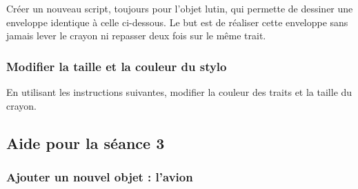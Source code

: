 Créer un nouveau script, toujours pour l'objet lutin, qui permette de dessiner une enveloppe identique à celle ci-dessous. Le but est de réaliser cette enveloppe sans jamais lever le crayon ni repasser deux fois sur le même trait.





\subsubsection{Modifier la taille et la couleur du stylo}

En utilisant les instructions suivantes, modifier la couleur des traits et la taille du crayon.











%
%
%
%









\subsection{Aide pour la séance 3}\label{correction_scratch3}



\subsubsection{Ajouter un nouvel objet : l'avion}

